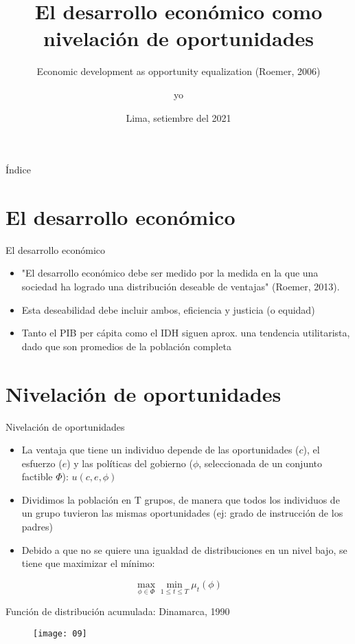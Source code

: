 \documentclass[11.5 pt]{beamer}
\title[]
{El desarrollo económico como nivelación de oportunidades}
\subtitle[]
{Economic development as opportunity equalization (Roemer, 2006)}
\author[]
{yo}
\date[]
{Lima, setiembre del 2021}
\begin{document}
\begin{frame}
  \titlepage
\end{frame}

\begin{frame}
{Índice}
  \tableofcontents
\end{frame}



\section{El desarrollo económico}
\begin{frame}{El desarrollo económico}
	\begin{itemize}
		\item "El desarrollo económico debe ser medido por la medida en la que una sociedad ha logrado una distribución deseable de ventajas" (Roemer, 2013).
		\item Esta deseabilidad debe incluir ambos, eficiencia y justicia (o equidad)
		\item Tanto el PIB per cápita como el IDH siguen aprox. una tendencia utilitarista, dado que son promedios de la población completa
	\end{itemize}
\end{frame}




\section{Nivelación de oportunidades}
\begin{frame}{Nivelación de oportunidades}
\begin{itemize}
	\item La ventaja que tiene un individuo depende de las oportunidades ($c$), el esfuerzo ($e$) y las políticas del gobierno ($\phi$, seleccionada de un conjunto factible $\Phi$): $u(c, e, \phi)$
	\item Dividimos la población en T grupos, de manera que todos los individuos de un grupo tuvieron las mismas oportunidades (ej: grado de instrucción de los padres)
	\item Debido a que no se quiere una igualdad de distribuciones en un nivel bajo, se tiene que maximizar el mínimo:
\end{itemize}
\[
	\max_{\phi \in \Phi} \min_{1 \leq t \leq T} \mu_{t}(\phi)
\]
\end{frame}


\begin{frame}{Función de distribución acumulada: Dinamarca, 1990}
	\begin{figure}
		\texttt{[image: 09]}
	\end{figure}
\end{frame}
\end{document}
